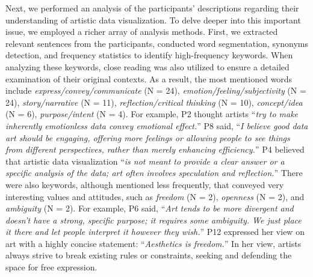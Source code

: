 Next, we performed an analysis of the participants' descriptions regarding their understanding of artistic data visualization. To delve deeper into this important issue, we employed a richer array of analysis methods. First, we extracted relevant sentences from the participants, conducted word segmentation, synonyms detection, and frequency statistics to identify high-frequency keywords. When analyzing these keywords, close reading was also utilized to ensure a detailed examination of their original contexts.
As a result, the most mentioned words include \textit{express/convey/communicate} (N = 24), \textit{emotion/feeling/subjectivity} (N = 24), \textit{story/narrative} (N = 11), \textit{reflection/critical thinking} (N = 10), \textit{concept/idea} (N = 6), \textit{purpose/intent} (N = 4).
For example, P2 thought artists ``\textit{try to make inherently emotionless data convey emotional effect.}'' P8 said, ``\textit{I believe good data art should be engaging, offering more feelings or allowing people to see things from different perspectives, rather than merely enhancing efficiency.}''
P4 believed that artistic data visualization ``\textit{is not meant to provide a clear answer or a specific analysis of the data; art often involves speculation and reflection.}''
There were also keywords, although mentioned less frequently, that conveyed very interesting values and attitudes, such as \textit{freedom} (N = 2), \textit{openness} (N = 2), and \textit{ambiguity} (N = 2).
For example, P6 said, ``\textit{Art tends to be more divergent and doesn’t have a strong, specific purpose; it requires some ambiguity. We just place it there and let people interpret it however they wish.}'' P12 expressed her view on art with a highly concise statement: ``\textit{Aesthetics is freedom.}'' In her view, artists always strive to break existing rules or constraints, seeking and defending the space for free expression.

